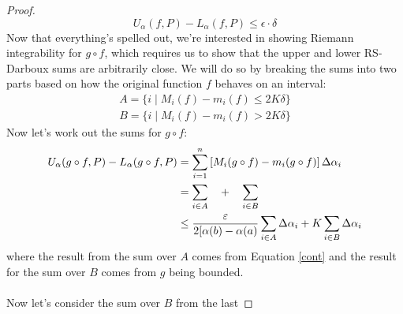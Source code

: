 \documentclass[12pt]{article}
\theoremstyle{plain}
\theoremstyle{definition}
\theoremstyle{remark}
\begin{document}
\begin{itemize}
\begin{proof}
\begin{equation}
                \label{forf}
                 U_\alpha(f,P)- L_\alpha(f,P) \leq \epsilon\cdot
                    \delta
            \end{equation}
            Now that everything's spelled out, 
            we're interested in showing Riemann 
            integrability for $g\circ f$, which requires us
            to show that the upper and lower RS-Darboux sums
            are arbitrarily close. We will do so by breaking
            the sums into two parts based on how
            the original function $f$ behaves on an interval:
            \begin{align*}
                A = \{ i \; | \; M_i(f) - m_i(f)\leq2K\delta\}\\
                B = \{ i \; | \; M_i(f) - m_i(f)>2K\delta\}
            \end{align*}
            Now let's work out the sums for $g\circ f$:
            \begin{align}
                U_\alpha(g\circ f,P) - L_\alpha(g\circ f,P)
                    &= \sum^n_{i=1} \left[
                    M_i(g\circ f) - m_i(g\circ f)\right]
                    \Delta\alpha_i \notag\\
                &= \sum_{i\in A} \quad + \quad
                    \sum_{i\in B} \notag\\
                \qquad
                &\leq \frac{\varepsilon}{2[\alpha(b)-\alpha(a)} 
                    \sum_{i\in A} \Delta\alpha_i+
                    K \sum_{i\in B} \Delta\alpha_i
                    \label{final}
            \end{align}
            where the result from the sum over $A$ comes from 
            Equation \ref{cont} and the result for the sum over 
            $B$ comes from $g$ being bounded.
            \\
            \\
            Now let's consider the sum over $B$ from the last

\end{proof}
\end{itemize}
\end{document}
